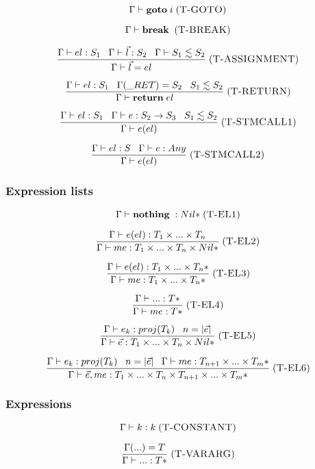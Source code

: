 \documentclass[12pt]{article}
\newcommand{\mylabel}[1]{\; (\textsc{#1})}
\newcommand{\kw}[1]{\mathbf{#1} \;}
\newcommand{\env}{\Gamma}
\newcommand{\ret}{\string_RET}
\begin{document}
\[
\env \vdash \kw{goto} i
\mylabel{T-GOTO}
\]

\[
\env \vdash \kw{break}
\mylabel{T-BREAK}
\]

\[
\frac{\env \vdash el:S_{1} \;\;\;
      \env \vdash \vec{l}:S_{2} \;\;\;
      \env \vdash S_{1} \lesssim S_{2}}
     {\env \vdash \vec{l} = el}
\mylabel{T-ASSIGNMENT}
\]

\[
\frac{\env \vdash el:S_{1} \;\;\;
      \env(\ret) = S_{2} \;\;\;
      S_{1} \lesssim S_{2}}
     {\env \vdash \kw{return} el}
\mylabel{T-RETURN}
\]

\[
\frac{\env \vdash el:S_{1} \;\;\;
      \env \vdash e:S_{2} \rightarrow S_{3} \;\;\;
      S_{1} \lesssim S_{2}}
     {\env \vdash e(el)}
\mylabel{T-STMCALL1}
\]

\[
\frac{\env \vdash el:S \;\;\;
      \env \vdash e:Any}
     {\env \vdash e(el)}
\mylabel{T-STMCALL2}
\]

\subsubsection{Expression lists}

\[
\env \vdash \kw{nothing}:{Nil*}
\mylabel{T-EL1}
\]

\[
\frac{\env \vdash e(el):T_{1} \times ... \times T_{n}}
     {\env \vdash me:T_{1} \times ... \times T_{n} \times {Nil*}}
\mylabel{T-EL2}
\]

\[
\frac{\env \vdash e(el):T_{1} \times ... \times {T_{n}*}}
     {\env \vdash me:T_{1} \times ... \times {T_{n}*}}
\mylabel{T-EL3}
\]

\[
\frac{\env \vdash {...}:{T*}}
     {\env \vdash me:{T*}}
\mylabel{T-EL4}
\]

\[
\frac{\env \vdash e_{k}:proj(T_{k}) \;\;\;
      n = |\vec{e}|}
     {\env \vdash \vec{e}:T_{1} \times ... \times T_{n} \times {Nil*}}
\mylabel{T-EL5}
\]

\[
\frac{\env \vdash e_{k}:proj(T_{k}) \;\;\;
      n = |\vec{e}|\;\;\;
      \env \vdash me:T_{n+1} \times ... \times {T_{m}*}}
     {\env \vdash \vec{e},me:T_{1} \times ... \times T_{n} \times T_{n+1} \times ... \times {T_{m}*}}
\mylabel{T-EL6}
\]

\subsubsection{Expressions}

\[
\env \vdash k : k
\mylabel{T-CONSTANT}
\]

\[
\frac{\env({...}) = T}
     {\env \vdash {...} : {T*}}
\mylabel{T-VARARG}
\]
\end{document}
